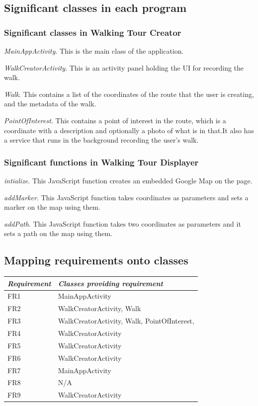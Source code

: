 \documentclass{project}
\begin{document}
\newpage

\subsection{Significant classes in each program}
\subsubsection{Significant classes in Walking Tour Creator}
\emph{MainAppActivity}. This is the main class of the application.

\emph{WalkCreatorActivity}. This is an activity panel holding the UI for
recording the walk.

\emph{Walk}. This contains a list of the coordinates of the route that the user
is creating, and the metadata of the walk.

\emph{PointOfInterest}. This contains a point of interest in the route, which
is a coordinate with a description and optionally a photo of what is in that.It also has a service that runs in the background
recording the user's walk.

\subsubsection{Significant functions in Walking Tour Displayer}
\emph{intialize}. This JavaScript function creates an embedded Google Map on
the page.

\emph{addMarker}. This JavaScript function takes coordinates as parameters and
sets a marker on the map using them.

\emph{addPath}. This JavaScript function takes two coordinates as parameters
and it sets a path on the map using them.


\subsection{Mapping requirements onto classes}
\begin{tabular}{|l |l |}
\hline
\emph{Requirement} & \emph{Classes providing requirement} \\
\hline
FR1 & MainAppActivity \\
\hline
FR2 & WalkCreatorActivity, Walk \\
\hline
FR3 & WalkCreatorActivity, Walk, PointOfInterest,  \\
\hline
FR4 & WalkCreatorActivity \\
\hline
FR5 & WalkCreatorActivity \\
\hline
FR6 & WalkCreatorActivity \\
\hline
FR7 & MainAppActivity \\
\hline
FR8 & N/A \\
\hline
FR9 & WalkCreatorActivity \\
\hline
\end{tabular}
\end{document}
